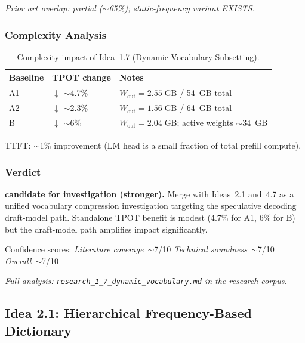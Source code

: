 \documentclass[11pt]{article}
\begin{document}
\noindent
\emph{Prior art overlap: partial ($\sim$65\%); static-frequency variant EXISTS.}

\subsubsection*{Complexity Analysis}

\begin{table}[h]
\centering
\caption{Complexity impact of Idea~1.7 (Dynamic Vocabulary Subsetting).}
\label{tab:complexity-1-7}
\begin{tabular}{llp{7cm}}
\toprule
\textbf{Baseline} & \textbf{TPOT change} & \textbf{Notes} \\
\midrule
A1 & $\downarrow$ $\sim$4.7\% & $W_\text{out} = 2.55\;\text{GB}$ / 54~GB total \\
A2 & $\downarrow$ $\sim$2.3\% & $W_\text{out} = 1.56\;\text{GB}$ / 64~GB total \\
B  & $\downarrow$ $\sim$6\%   & $W_\text{out} = 2.04\;\text{GB}$; active weights $\sim$34~GB \\
\bottomrule
\end{tabular}
\end{table}

\noindent
TTFT: $\sim$1\% improvement (LM head is a small fraction of total prefill compute).

\subsubsection*{Verdict}
\textbf{candidate for investigation (stronger).}
Merge with Ideas~2.1 and~4.7 as a unified vocabulary compression investigation targeting the speculative decoding draft-model path.
Standalone TPOT benefit is modest (4.7\% for A1, 6\% for B) but the draft-model path amplifies impact significantly.

\noindent
Confidence scores:
\emph{Literature coverage}~$\sim$7/10 \quad
\emph{Technical soundness}~$\sim$7/10 \quad
\emph{Overall}~$\sim$7/10
\par\noindent\textit{Full analysis: \texttt{research\_1\_7\_dynamic\_vocabulary.md} in the research corpus.}


\subsection{Idea 2.1: Hierarchical Frequency-Based Dictionary}
\label{subsec:idea-2-1}
\end{document}
